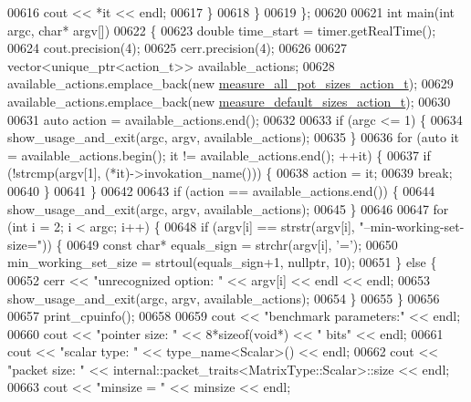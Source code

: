 \begin{DoxyCode}
{{{{{{{00616       cout << *it << endl;
00617     \}
00618   \}
00619 \};
00620 
00621 \textcolor{keywordtype}{int} main(\textcolor{keywordtype}{int} argc, \textcolor{keywordtype}{char}* argv[])
00622 \{
00623   \textcolor{keywordtype}{double} time\_start = timer.getRealTime();
00624   cout.precision(4);
00625   cerr.precision(4);
00626 
00627   vector<unique\_ptr<action\_t>> available\_actions;
00628   available\_actions.emplace\_back(\textcolor{keyword}{new} \hyperlink{structmeasure__all__pot__sizes__action__t}{measure\_all\_pot\_sizes\_action\_t});
00629   available\_actions.emplace\_back(\textcolor{keyword}{new} \hyperlink{structmeasure__default__sizes__action__t}{measure\_default\_sizes\_action\_t});
00630 
00631   \textcolor{keyword}{auto} action = available\_actions.end();
00632 
00633   \textcolor{keywordflow}{if} (argc <= 1) \{
00634     show\_usage\_and\_exit(argc, argv, available\_actions);
00635   \}
00636   \textcolor{keywordflow}{for} (\textcolor{keyword}{auto} it = available\_actions.begin(); it != available\_actions.end(); ++it) \{
00637     \textcolor{keywordflow}{if} (!strcmp(argv[1], (*it)->invokation\_name())) \{
00638       action = it;
00639       \textcolor{keywordflow}{break};
00640     \}
00641   \}
00642 
00643   \textcolor{keywordflow}{if} (action == available\_actions.end()) \{
00644     show\_usage\_and\_exit(argc, argv, available\_actions);
00645   \}
00646 
00647   \textcolor{keywordflow}{for} (\textcolor{keywordtype}{int} i = 2; i < argc; i++) \{
00648     \textcolor{keywordflow}{if} (argv[i] == strstr(argv[i], \textcolor{stringliteral}{"--min-working-set-size="})) \{
00649       \textcolor{keyword}{const} \textcolor{keywordtype}{char}* equals\_sign = strchr(argv[i], \textcolor{charliteral}{'='});
00650       min\_working\_set\_size = strtoul(equals\_sign+1, \textcolor{keyword}{nullptr}, 10);
00651     \} \textcolor{keywordflow}{else} \{
00652       cerr << \textcolor{stringliteral}{"unrecognized option: "} << argv[i] << endl << endl;
00653       show\_usage\_and\_exit(argc, argv, available\_actions);
00654     \}
00655   \}
00656 
00657   print\_cpuinfo();
00658 
00659   cout << \textcolor{stringliteral}{"benchmark parameters:"} << endl;
00660   cout << \textcolor{stringliteral}{"pointer size: "} << 8*\textcolor{keyword}{sizeof}(\textcolor{keywordtype}{void}*) << \textcolor{stringliteral}{" bits"} << endl;
00661   cout << \textcolor{stringliteral}{"scalar type: "} << type\_name<Scalar>() << endl;
00662   cout << \textcolor{stringliteral}{"packet size: "} << internal::packet\_traits<MatrixType::Scalar>::size << endl;
00663   cout << \textcolor{stringliteral}{"minsize = "} << minsize << endl;
}}}}}}}
\end{DoxyCode}
